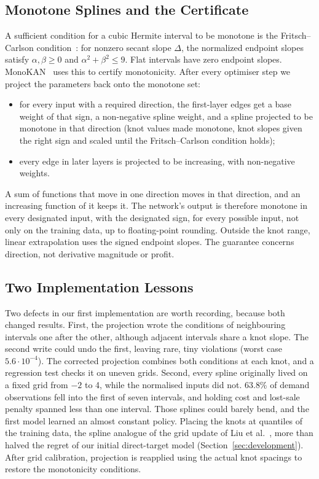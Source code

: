 \documentclass[conference]{IEEEtran}
\begin{document}
\subsection{Monotone Splines and the Certificate}\label{sec:certificate}
A sufficient condition for a cubic Hermite interval to be monotone is the Fritsch--Carlson
condition~\cite{fritsch1980}: for nonzero secant slope $\Delta$, the normalized endpoint slopes satisfy
$\alpha,\beta\geq0$ and $\alpha^2+\beta^2\leq9$. Flat intervals have zero endpoint slopes.
MonoKAN~\cite{polomolina2024} uses this to certify monotonicity. After every optimiser step we project the parameters
back onto the monotone set:
\begin{itemize}
\item for every input with a required direction, the first-layer edges get a base weight of that sign, a non-negative
spline weight, and a spline projected to be monotone in that direction (knot values made monotone, knot slopes given
the right sign and scaled until the Fritsch--Carlson condition holds);
\item every edge in later layers is projected to be increasing, with non-negative weights.
\end{itemize}
A sum of functions that move in one direction moves in that direction, and an increasing function of it keeps it. The
network's output is therefore monotone in every designated input, with the designated sign, for every possible input,
not only on the training data, up to floating-point rounding. Outside the knot range, linear extrapolation uses the
signed endpoint slopes. The guarantee concerns direction, not derivative magnitude or profit.

\subsection{Two Implementation Lessons}\label{sec:lessons}
Two defects in our first implementation are worth recording, because both changed results. First, the projection wrote
the conditions of neighbouring intervals one after the other, although adjacent intervals share a knot slope. The
second write could undo the first, leaving rare, tiny violations (worst case $5.6 \cdot 10^{-4}$). The corrected
projection combines both conditions at each knot, and a regression test checks it on uneven grids. Second, every
spline originally lived on a fixed grid from $-2$ to 4, while the normalised inputs did not. 63.8\% of demand
observations fell into the first of seven intervals, and holding cost and lost-sale penalty spanned less than one
interval. Those splines could barely bend, and the first model learned an almost constant policy. Placing the knots at
quantiles of the training data, the spline analogue of the grid update of Liu et al.~\cite{liu2024}, more than halved
the regret of our initial direct-target model (Section~\ref{sec:development}). After grid calibration, projection is
reapplied using the actual knot spacings to restore the monotonicity conditions.
\end{document}
